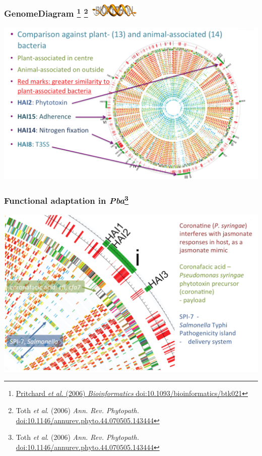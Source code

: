 \begin{frame}
  \frametitle{GenomeDiagram 
    \footnote{\tiny{\href{http://dx.doi.org/10.1093/bioinformatics/btk021}{Pritchard \textit{et al.} (2006) \textit{Bioinformatics} doi:10.1093/bioinformatics/btk021}}}
    \footnote{\tiny{Toth \textit{et al}. (2006) \textit{Ann. Rev. Phytopath.} \href{http://dx.doi.org/10.1146/annurev.phyto.44.070505.143444}{doi:10.1146/annurev.phyto.44.070505.143444}}}
    \includegraphics[width=0.18\textwidth]{images/biopython}
  }
  \begin{center}
      \includegraphics[width=1\textwidth]{images/pba_lgt} 
  \end{center}
\end{frame}

\begin{frame}
  \frametitle{Functional adaptation in \textit{Pba}\footnote{\tiny{Toth \textit{et al}. (2006) \textit{Ann. Rev. Phytopath.} \href{http://dx.doi.org/10.1146/annurev.phyto.44.070505.143444}{doi:10.1146/annurev.phyto.44.070505.143444}}}}
  \begin{center}
      \includegraphics[width=1\textwidth]{images/pba_coronatine} 
  \end{center}
\end{frame}

